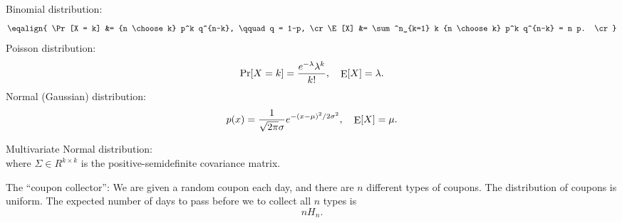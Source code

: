 Binomial distribution:
$$
\eqalign{
\Pr[X = k] &= {n \choose k} p^k q^{n-k}, \qquad q = 1-p, \cr
\E[X] &= \sum^n_{k=1} k {n \choose k} p^k q^{n-k} = n p. \cr
}
$$
Poisson distribution:
$$
\mathop{\rm Pr}\nolimits[X = k] = {e^{-\lambda} \lambda^k \over k!}, \quad  \mathop{\rm E}\nolimits[X] = \lambda.
$$
Normal (Gaussian) distribution:
$$
p(x) = {1 \over \sqrt{2 \pi} \sigma} e^{-(x-\mu)^2/2\sigma^2}, \quad \mathop{\rm E}\nolimits[X] = \mu.
$$

Multivariate Normal distribution:
$$
$$
where $\Sigma \in R^{k \times k } $ is the positive-semidefinite covariance matrix.

The ``coupon collector'':
We are given a random coupon each day,
and there are $n$ different types of coupons.
The distribution of coupons is uniform.
The expected number of days to pass before we to collect all $n$ types is
$$n H_n.$$

